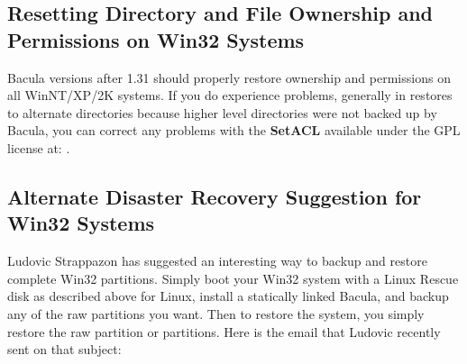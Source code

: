 \subsection*{Resetting Directory and File Ownership and Permissions on Win32
Systems}

Bacula versions after 1.31 should properly restore ownership and permissions
on all WinNT/XP/2K systems. If you do experience problems, generally in
restores to alternate directories because higher level directories were not
backed up by Bacula, you can correct any problems with the {\bf SetACL}
available under the GPL license at: 
. 

\subsection*{Alternate Disaster Recovery Suggestion for Win32 Systems}

Ludovic Strappazon has suggested an interesting way to backup and restore
complete Win32 partitions. Simply boot your Win32 system with a Linux Rescue
disk as described above for Linux, install a statically linked Bacula, and
backup any of the raw partitions you want. Then to restore the system, you
simply restore the raw partition or partitions. Here is the email that Ludovic
recently sent on that subject: 

